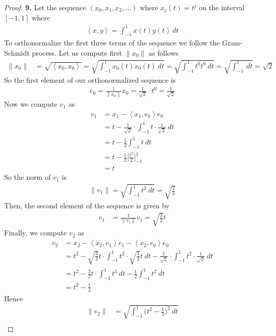 \documentclass[11pt]{article}
\newcommand{\inprd}[1]{\left\langle{#1}\right\rangle}
\theoremstyle{definition}
\begin{document}
\cleardoublepage
\begin{proof}{\textbf{9.}}
Let the sequence $(x_0, x_1, x_2, ...)$ where $x_j(t) = t^j$ on the interval
$[-1,1]$ where 
\begin{align*}
    \inprd{x,y} = \int_{-1}^1 x(t)y(t)~dt
\end{align*}
To orthonormalize the first three terms of the sequence we follow the 
Gram-Schmidt process.
Let us compute first $\|x_0\|$ as follows
\begin{align*}
    \|x_0\| &= \sqrt{\inprd{x_0, x_0}} = \sqrt{\int_{-1}^1 x_0(t)x_0(t)~dt}
    = \sqrt{\int_{-1}^1 t^0t^0~dt} = \sqrt{\int_{-1}^1~dt} = \sqrt{2}
\end{align*}
So the first element of our orthonormalized sequence is
\begin{align*}
    e_0 = \frac{1}{\|x_0\|} x_0 = \frac{1}{\sqrt{2}}\cdot t^0 = \frac{1}{\sqrt{2}}
\end{align*}
Now we compute $v_1$ as 
\begin{align*}
    v_1 &= x_1 - \inprd{x_1, e_0}e_0\\
    &= t - \frac{1}{\sqrt{2}}\cdot\int_{-1}^1 t\cdot \frac{1}{\sqrt{2}}~dt\\
    &= t - \frac{1}{2}\int_{-1}^1 t ~dt\\
    &= t - \frac{1}{2}\bigg[\frac{t^2}{2}\bigg]_{-1}^1\\
    &= t
\end{align*}
So the norm of $v_1$ is
\begin{align*}
    \|v_1\| = \sqrt{\int_{-1}^1 t^2~dt} = \sqrt{\frac{2}{3}}
\end{align*}
Then, the second element of the sequence is given by
\begin{align*}
    e_1 &= \frac{1}{\|v_1\|} v_1 = \sqrt{\frac{3}{2}}t
\end{align*}
Finally, we compute $v_2$ as
\begin{align*}
    v_2 &= x_2 - \inprd{x_2, e_1}e_1 - \inprd{x_2, e_0}e_0\\
    &= t^2 - \sqrt{\frac{3}{2}}t\cdot\int_{-1}^1 t^2\cdot \sqrt{\frac{3}{2}}t~dt
    - \frac{1}{\sqrt{2}}\cdot\int_{-1}^1 t^2\cdot \frac{1}{\sqrt{2}}~dt\\
    &= t^2 - \frac{3}{2}t\cdot\int_{-1}^1 t^3~dt
    - \frac{1}{2}\int_{-1}^1 t^2~dt\\
    &= t^2 - \frac{1}{3}
\end{align*}
Hence
\begin{align*}
    \|v_2\|
    &= \sqrt{\int_{-1}^1 \bigg(t^2 - \frac{1}{3}\bigg)^2~dt}\\

\end{align*}
\end{proof}
\end{document}
